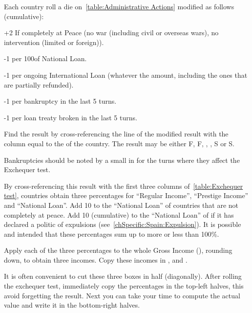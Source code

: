  Each country roll a die on~\ref{table:Administrative
  Actions} modified as follows (cumulative):
\begin{modlist}
\item[+2] If completely at Peace (no war (including civil or overseas wars),
  no intervention (limited or foreign)).
\item[-1 ] per 100\ducats of National Loan.
\item[-1] per ongoing International Loan (whatever the amount, including the
  ones that are partially refunded).
\item[-1 ] per bankruptcy in the last 5 turns.
\item[-1] per loan treaty broken in the last 5 turns.
\end{modlist}
\bparag Find the result by cross-referencing the line of the modified result
with the column equal to the \STAB of the country.
\bparag The result may be either F\textetoile, F, \undemi, \undemi\textetoile,
S or S\textetoile.

\begin{playtip}
  Bankruptcies should be noted by a small \textetoile in  for the turns where they affect the Exchequer test.
\end{playtip}

\aparag[Percentages] By cross-referencing this result with the first three
columns of~\ref{table:Exchequer test}, countries obtain three percentages for
``Regular Income'', ``Prestige Income'' and ``National Loan''.
\bparag Add 10 to the ``National Loan'' of countries that are not completely
at peace.
\bparag Add 10 (cumulative) to the ``National Loan'' of \HIS if it has
declared a politic of expulsions (see~\ref{chSpecific:Spain:Expulsion}).
\bparag It is possible and intended that these percentages sum up to more or
less than 100\%.

\aparag[Incomes] Apply each of the three percentages to the whole Gross Income
(), rounding down, to obtain three incomes.
\bparag Copy these incomes in ,
 and .

\begin{playtip}
  It is often convenient to cut these three boxes in half (diagonally). After
  rolling the exchequer test, immediately copy the percentages in the top-left
  halves, this avoid forgetting the result. Next you can take your time to
  compute the actual value and write it in the bottom-right halves.
\end{playtip}

